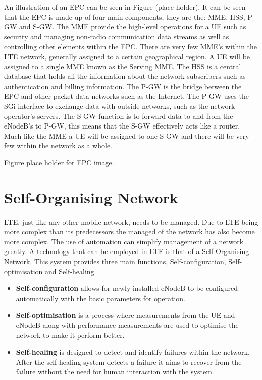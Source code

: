 An illustration of an EPC can be seen in Figure (place holder). It can be seen that the EPC is made up of four main components, they are the: \ac{MME}, \ac{HSS}, \ac{P-GW} and \ac{S-GW}. 
The MME provide the high-level operations for a UE such as security and managing non-radio communication data streams as well as controlling other elements within the EPC. There are very few MME's within the LTE network, generally assigned to a certain geographical region. A UE will be assigned to a single MME known as the Serving MME. 
The HSS is a central database that holds all the information about the network subscribers such as authentication and billing information.
The P-GW is the bridge between the EPC and other packet data networks such as the Internet. The P-GW uses the SGi interface to exchange data with outside networks, such as the network operator's servers.
The S-GW function is to forward data to and from the eNodeB's to P-GW, this means that the S-GW effectively acts like a router. Much like the MME a UE will be assigned to one S-GW and there will be very few within the network as a whole.

Figure place holder for EPC image.
~\cite{cox2012introduction, 3gpp2013network}

\section{Self-Organising Network}\label{self organising network}
LTE, just like any other mobile network, needs to be managed. Due to LTE being more complex than its predecessors the managed of the network has also become more complex. The use of automation can simplify management of a network greatly. A technology that can be employed in LTE is that of a Self-Organising Network. This system provides three main functions, Self-configuration, Self-optimisation and Self-healing.~\cite{feng2008self,3gpp2011self}
\begin{itemize}
  \item \textbf{Self-configuration} allows for newly installed eNodeB to be configured automatically with the basic parameters for operation.  

  \item \textbf{Self-optimisation} is a process where measurements from the UE and eNodeB along with performance measurements are used to optimise the network to make it perform better.

  \item \textbf{Self-healing} is designed to detect and identify failures within the network. After the self-healing system detects a failure it aims to recover from the failure without the need for human interaction with the system.
\end{itemize}


